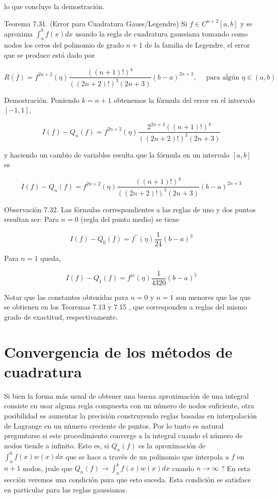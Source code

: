 \documentclass[10pt]{book}
\begin{document}
lo que concluye la demostración.

Teorema 7.31. (Error para Cuadratura Gauss/Legendre) Si $f \in C^{n+2}[a, b]$ y se aproxima $\int_{a}^{b} f(x) d x$ usando la regla de cuadratura gaussiana tomando como nodos los ceros del polinomio de grado $n+1$ de la familia de Legendre, el error que se produce está dado por


\begin{equation*}
R(f)=f^{2 n+2}(\eta) \frac{((n+1)!)^{4}}{((2 n+2)!)^{3}(2 n+3)}(b-a)^{2 n+3}, \quad \text { para algún } \eta \in(a, b) \tag{7.14}
\end{equation*}


Demostración. Poniendo $k=n+1$ obtenemos la fórmula del error en el intervalo $[-1,1]$,

$$
I(f)-Q_{n}(f)=f^{2 n+2}(\eta) \frac{2^{2 n+3}((n+1)!)^{4}}{((2 n+2)!)^{3}(2 n+3)}
$$

y haciendo un cambio de variables resulta que la fórmula en un intervalo $[a, b]$ es

$$
I(f)-Q_{n}(f)=f^{2 n+2}(\eta) \frac{((n+1)!)^{4}}{((2 n+2)!)^{3}(2 n+3)}(b-a)^{2 n+3}
$$

Observación 7.32. Las fórmulas correspondientes a las reglas de uno y dos puntos resultan ser: Para $n=0$ (regla del punto medio) se tiene

$$
I(f)-Q_{0}(f)=f^{\prime \prime}(\eta) \frac{1}{24}(b-a)^{3}
$$

Para $n=1$ queda,

$$
I(f)-Q_{1}(f)=f^{i v}(\eta) \frac{1}{4320}(b-a)^{5}
$$

Notar que las constantes obtenidas para $n=0$ y $n=1$ son menores que las que se obtienen en los Teoremas 7.13 y 7.15 , que corresponden a reglas del mismo grado de exactitud, respectivamente.

\section{Convergencia de los métodos de cuadratura}
Si bien la forma más usual de obtener una buena aproximación de una integral consiste en usar alguna regla compuesta con un número de nodos suficiente, otra posibilidad es aumentar la precisión construyendo reglas basadas en interpolación de Lagrange en un número creciente de puntos. Por lo tanto es natural preguntarse si este procedimiento converge a la integral cuando el número de nodos tiende a infinito. Esto es, si $Q_{n}(f)$ es la aproximación de $\int_{a}^{b} f(x) w(x) d x$ que se hace a través de un polinomio que interpola a $f$ en $n+1$ nodos, jvale que $Q_{n}(f) \rightarrow \int_{a}^{b} f(x) w(x) d x$ cuando $n \rightarrow \infty$ ? En esta sección veremos una condición para que esto suceda. Esta condición se satisface en particular para las reglas gaussianas.
\end{document}
